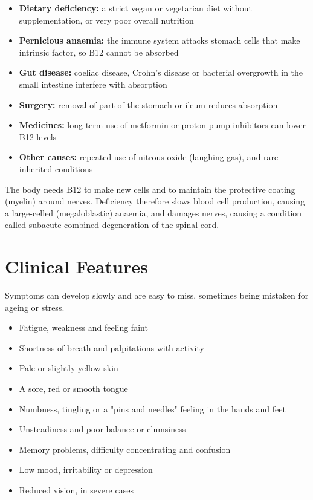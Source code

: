 \begin{itemize}
    \item \textbf{Dietary deficiency:} a strict vegan or vegetarian diet without supplementation, or very poor overall nutrition
    \item \textbf{Pernicious anaemia:} the immune system attacks stomach cells that make intrinsic factor, so B12 cannot be absorbed
    \item \textbf{Gut disease:} coeliac disease, Crohn's disease or bacterial overgrowth in the small intestine interfere with absorption
    \item \textbf{Surgery:} removal of part of the stomach or ileum reduces absorption
    \item \textbf{Medicines:} long-term use of metformin or proton pump inhibitors can lower B12 levels
    \item \textbf{Other causes:} repeated use of nitrous oxide (laughing gas), and rare inherited conditions
\end{itemize}

The body needs B12 to make new cells and to maintain the protective coating (myelin) around nerves. Deficiency therefore slows blood cell production, causing a large-celled (megaloblastic) anaemia, and damages nerves, causing a condition called subacute combined degeneration of the spinal cord.

\section*{Clinical Features}
Symptoms can develop slowly and are easy to miss, sometimes being mistaken for ageing or stress.

\begin{itemize}
    \item Fatigue, weakness and feeling faint
    \item Shortness of breath and palpitations with activity
    \item Pale or slightly yellow skin
    \item A sore, red or smooth tongue
    \item Numbness, tingling or a "pins and needles" feeling in the hands and feet
    \item Unsteadiness and poor balance or clumsiness
    \item Memory problems, difficulty concentrating and confusion
    \item Low mood, irritability or depression
    \item Reduced vision, in severe cases
\end{itemize}

